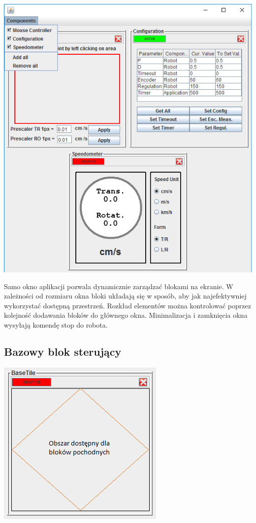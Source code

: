 \documentclass[eng,printmode]{mgr}
\begin{document}
\begin{center}
  \includegraphics[width=1\textwidth]{images/metro_all}
\end{center}

Samo okno aplikacji pozwala dynamicznie zarządzać blokami na ekranie. W zależności od rozmiaru okna bloki układają się w sposób, aby jak najefektywniej wykorzystać dostępną przestrzeń. Rozkład elementów można kontrolować poprzez kolejność dodawania bloków do głównego okna. Minimalizacja i zamknięcia okna wysyłają komendę stop do robota.

 \subsection{Bazowy blok sterujący}

\begin{center}
  \includegraphics{images/bazowy}
\end{center}
\end{document}
